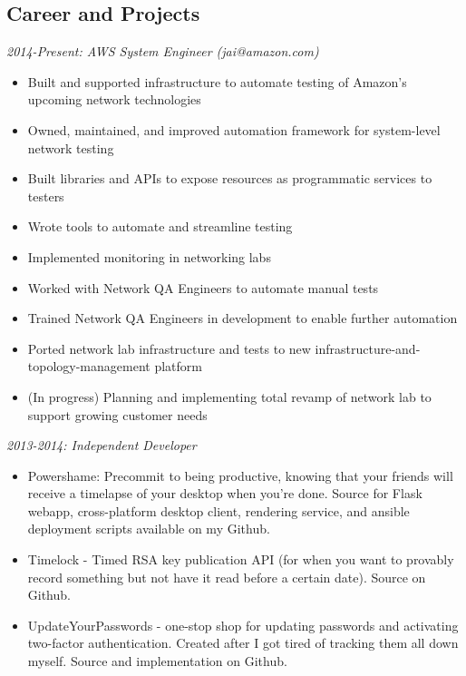 \documentclass[line]{res} %
\begin{document}
\address{jai@jaibot.com - http://jaibot.com - http://github.com/jaibot}

\begin{resume}
\section{Career and Projects} 

{\sl 2014-Present: AWS System Engineer (jai@amazon.com)}
    \begin{itemize} 
        \item Built and supported infrastructure to automate testing of Amazon's upcoming network technologies
        \item Owned, maintained, and improved automation framework for system-level network testing
        \item Built libraries and APIs to expose resources as programmatic services to testers
        \item Wrote tools to automate and streamline testing
        \item Implemented monitoring in networking labs
        \item Worked with Network QA Engineers to automate manual tests
        \item Trained Network QA Engineers in development to enable further automation
        \item Ported network lab infrastructure and tests to new infrastructure-and-topology-management platform
        \item (In progress) Planning and implementing total revamp of network lab to support growing customer needs
    \end{itemize}

{\sl 2013-2014: Independent Developer }
    \begin{itemize} 
        \item Powershame: Precommit to being productive, knowing that your friends will receive a timelapse of your desktop when you're done. Source for Flask webapp, cross-platform desktop client, rendering service, and ansible deployment scripts available on my Github.
    \item Timelock - Timed RSA key publication API (for when you want to provably record something but not have it read before a certain date). Source on Github.
    \item UpdateYourPasswords - one-stop shop for updating passwords and activating two-factor authentication. Created after I got tired of tracking them all down myself. Source and implementation on Github.
    \end{itemize}



\end{resume}
\end{document}
